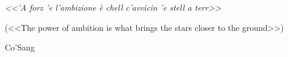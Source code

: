 \cleardoublepage
\thispagestyle{empty}
\begin{flushright}
\itshape <<'A forz 'e l'ambizione è chell c'avvicin 'e stell a terr>> 

        (<<The power of ambition is what brings the stars closer to the ground>>)

         Co'Sang

\end{flushright}
\cleardoublepage